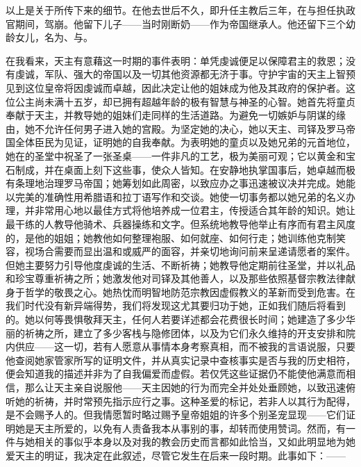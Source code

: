 以上是关于所传下来的细节。在他去世后不久，即升任主教后三年，在与担任执政官期间，驾崩。他留下儿子——当时刚断奶——作为帝国继承人。他还留下三个幼龄女儿，名为、与。\par

在我看来，天主有意藉这一时期的事件表明：单凭虔诚便足以保障君主的救恩；没有虔诚，军队、强大的帝国以及一切其他资源都无济于事。守护宇宙的天主上智预见到这位皇帝将因虔诚而卓越，因此决定让他的姐妹成为他及其政府的保护者。这位公主尚未满十五岁，却已拥有超越年龄的极有智慧与神圣的心智。她首先将童贞奉献于天主，并教导她的姐妹们走同样的生活道路。为避免一切嫉妒与阴谋的缘由，她不允许任何男子进入她的宫殿。为坚定她的决心，她以天主、司铎及罗马帝国全体臣民为见证，证明她的自我奉献。为表明她的童贞以及她兄弟的元首地位，她在的圣堂中祝圣了一张圣桌——一件非凡的工艺，极为美丽可观；它以黄金和宝石制成，并在桌面上刻下这些事，使众人皆知。在安静地执掌国事后，她卓越而极有条理地治理罗马帝国；她筹划如此周密，以致应办之事迅速被议决并完成。她能以完美的准确性用希腊语和拉丁语写作和交谈。她使一切事务都以她兄弟的名义办理，并非常用心地以最佳方式将他培养成一位君主，传授适合其年龄的知识。她让最干练的人教导他骑术、兵器操练和文字。但系统地教导他举止有序而有君主风度的，是他的姐姐；她教他如何整理袍服、如何就座、如何行走；她训练他克制笑容，视场合需要而显出温和或威严的面容，并亲切地询问前来呈递请愿者的案件。但她主要努力引导他度虔诚的生活、不断祈祷；她教导他定期前往圣堂，并以礼品和珍宝尊重祈祷之所；她激发他对司铎及其他善人，以及那些依照基督宗教法律献身于哲学的敬畏之心。她热忱而明智地防范宗教因虚假教义的革新而受到危害。在我们时代没有新异端得势，我们将发现这尤其要归功于她，正如我们随后将看到的。她以何等畏惧敬拜天主，任何人若要详述都会花费很长时间；她建造了多少华丽的祈祷之所，建立了多少客栈与隐修团体，以及为它们永久维持的开支安排和院内供应——这一切，若有人愿意从事情本身考察真相，而不被我的言语说服，只要他查阅她家管家所写的证明文件，并从真实记录中查核事实是否与我的历史相符，便会知道我的描述并非为了自我偏爱而虚假。若仅凭这些证据仍不能使他满意而相信，那么让天主亲自说服他——天主因她的行为而完全并处处垂顾她，以致迅速俯听她的祈祷，并时常预先指示应行之事。这种圣爱的标记，若非人以其行为配得，是不会赐予人的。但我情愿暂时略过赐予皇帝姐姐的许多个别圣宠显现——它们证明她是天主所爱的，以免有人责备我本从事别的事，却转而使用赞词。然而，有一件与她相关的事似乎本身以及对我的教会历史而言都如此恰当，又如此明显地为她爱天主的明证，我决定在此叙述，尽管它发生在后来一段时期。此事如下：——\par

